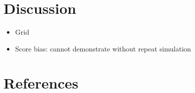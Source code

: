 \documentclass[
  11pt,
]{article}
\providecommand{\tightlist}{%
  \setlength{\itemsep}{0pt}\setlength{\parskip}{0pt}}
\begin{document}
\hypertarget{discussion}{%
\section{Discussion}\label{discussion}}

\begin{itemize}
\tightlist
\item
  Grid
\item
  Score bias: cannot demonstrate without repeat simulation
\end{itemize}

\hypertarget{references}{%
\section{References}\label{references}}

\hypertarget{refs}{}
\end{document}
